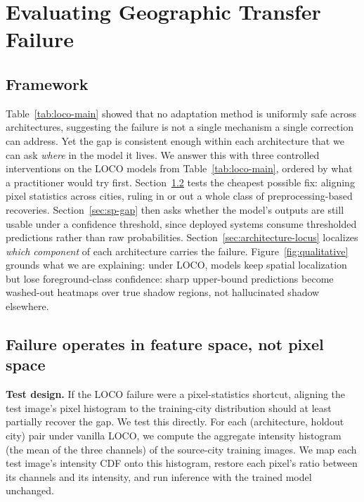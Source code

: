 \section{Evaluating Geographic Transfer Failure}
\label{sec:evaluation}

\subsection{Framework}
\label{sec:framework}





Table~\ref{tab:loco-main} showed that no adaptation method is uniformly safe across architectures, suggesting the failure is not a single mechanism a single correction can address. Yet the gap is consistent enough within each architecture that we can ask \emph{where} in the model it lives. We answer this with three controlled interventions on the LOCO models from Table~\ref{tab:loco-main}, ordered by what a practitioner would try first. Section~\ref{sec:feature-space} tests the cheapest possible fix: aligning pixel statistics across cities, ruling in or out a whole class of preprocessing-based recoveries. Section~\ref{sec:sp-gap} then asks whether the model's outputs are still usable under a confidence threshold, since deployed systems consume thresholded predictions rather than raw probabilities. Section~\ref{sec:architecture-locus} localizes \emph{which component} of each architecture carries the failure. Figure~\ref{fig:qualitative} grounds what we are explaining: under LOCO, models keep spatial localization but lose foreground-class confidence: sharp upper-bound predictions become washed-out heatmaps over true shadow regions, not hallucinated shadow elsewhere.

\subsection{Failure operates in feature space, not pixel space}
\label{sec:feature-space}

\textbf{Test design.} If the LOCO failure were a pixel-statistics shortcut, aligning the test image's pixel histogram to the training-city distribution should at least partially recover the gap. We test this directly. For each (architecture, holdout city) pair under vanilla LOCO, we compute the aggregate intensity histogram (the mean of the three channels) of the source-city training images. We map each test image's intensity CDF onto this histogram, restore each pixel's ratio between its channels and its intensity, and run inference with the trained model unchanged. 

